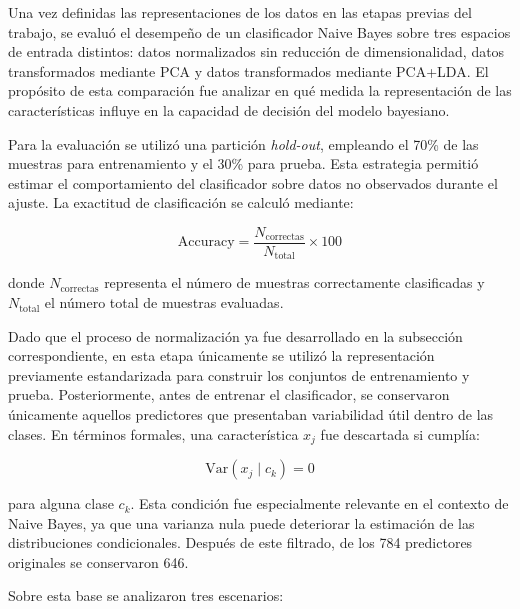 \documentclass[11pt, a4paper]{article}
\begin{document}
Una vez definidas las representaciones de los datos en las etapas previas del trabajo, se evaluó el desempeño de un clasificador Naive Bayes sobre tres espacios de entrada distintos: datos normalizados sin reducción de dimensionalidad, datos transformados mediante PCA y datos transformados mediante PCA+LDA. El propósito de esta comparación fue analizar en qué medida la representación de las características influye en la capacidad de decisión del modelo bayesiano.

Para la evaluación se utilizó una partición \textit{hold-out}, empleando el 70\% de las muestras para entrenamiento y el 30\% para prueba. Esta estrategia permitió estimar el comportamiento del clasificador sobre datos no observados durante el ajuste. La exactitud de clasificación se calculó mediante:

\begin{equation}
\text{Accuracy} = \frac{N_{\text{correctas}}}{N_{\text{total}}}\times 100
\end{equation}

donde $N_{\text{correctas}}$ representa el número de muestras correctamente clasificadas y $N_{\text{total}}$ el número total de muestras evaluadas.

Dado que el proceso de normalización ya fue desarrollado en la subsección correspondiente, en esta etapa únicamente se utilizó la representación previamente estandarizada para construir los conjuntos de entrenamiento y prueba. Posteriormente, antes de entrenar el clasificador, se conservaron únicamente aquellos predictores que presentaban variabilidad útil dentro de las clases. En términos formales, una característica $x_j$ fue descartada si cumplía:

\begin{equation}
\mathrm{Var}(x_j \mid c_k) = 0
\end{equation}

para alguna clase $c_k$. Esta condición fue especialmente relevante en el contexto de Naive Bayes, ya que una varianza nula puede deteriorar la estimación de las distribuciones condicionales. Después de este filtrado, de los 784 predictores originales se conservaron 646.

Sobre esta base se analizaron tres escenarios:
\end{document}
